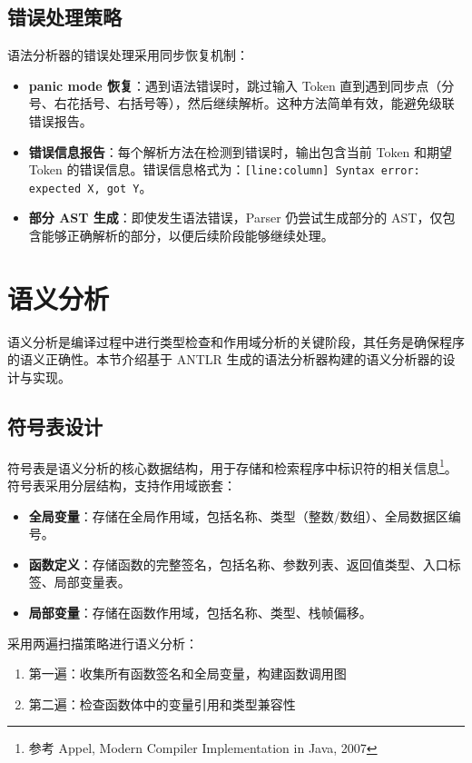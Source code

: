 \documentclass[12pt,hyperref,a4paper,UTF8]{ctexart}
\begin{document}
\subsection{错误处理策略}

语法分析器的错误处理采用同步恢复机制：

\begin{itemize}
    \item \textbf{panic mode 恢复}：遇到语法错误时，跳过输入 Token 直到遇到同步点（分号、右花括号、右括号等），然后继续解析。这种方法简单有效，能避免级联错误报告。
    \item \textbf{错误信息报告}：每个解析方法在检测到错误时，输出包含当前 Token 和期望 Token 的错误信息。错误信息格式为：\texttt{[line:column] Syntax error: expected X, got Y}。
    \item \textbf{部分 AST 生成}：即使发生语法错误，Parser 仍尝试生成部分的 AST，仅包含能够正确解析的部分，以便后续阶段能够继续处理。
\end{itemize}

\section{语义分析}

语义分析是编译过程中进行类型检查和作用域分析的关键阶段，其任务是确保程序的语义正确性。本节介绍基于 ANTLR 生成的语法分析器构建的语义分析器的设计与实现。

\subsection{符号表设计}

符号表是语义分析的核心数据结构，用于存储和检索程序中标识符的相关信息{}\footnote{参考 Appel, Modern Compiler Implementation in Java, 2007}。符号表采用分层结构，支持作用域嵌套：

\begin{itemize}
    \item \textbf{全局变量}：存储在全局作用域，包括名称、类型（整数/数组）、全局数据区编号。
    \item \textbf{函数定义}：存储函数的完整签名，包括名称、参数列表、返回值类型、入口标签、局部变量表。
    \item \textbf{局部变量}：存储在函数作用域，包括名称、类型、栈帧偏移。
\end{itemize}

采用两遍扫描策略进行语义分析：
\begin{enumerate}
    \item 第一遍：收集所有函数签名和全局变量，构建函数调用图
    \item 第二遍：检查函数体中的变量引用和类型兼容性
\end{enumerate}
\end{document}
